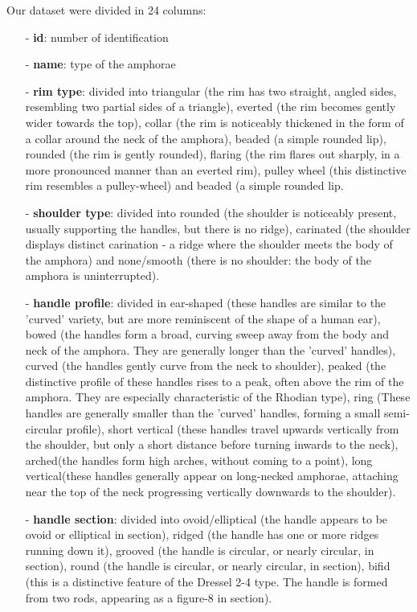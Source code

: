 \documentclass[10pt,a4paper]{article}
\begin{document}
Our dataset were divided in 24 columns:

\begin{itemize}
\item[-] \textbf{id}: number of identification

\item[-] \textbf{name}: type of the amphorae 

\item[-] \textbf{rim type}: divided into triangular (the rim has two straight, angled sides, resembling two partial sides of a triangle), everted (the rim becomes gently wider towards the top), collar (the rim is noticeably thickened in the form of a collar around the neck of the amphora), beaded (a simple rounded lip), rounded (the rim is gently rounded), flaring (the rim flares out sharply, in a more pronounced manner than an everted rim), pulley wheel (this distinctive rim resembles a pulley-wheel) and beaded (a simple rounded lip. 

\item[-] \textbf{shoulder type}: divided into rounded (the shoulder is noticeably present, usually supporting the handles, but there is no ridge), carinated (the shoulder displays distinct carination - a ridge where the shoulder meets the body of the amphora) and none/smooth (there is no shoulder: the body of the amphora is uninterrupted).

\item[-] \textbf{handle profile}: divided in ear-shaped (these handles are similar to the 'curved' variety, but are more reminiscent of the shape of a human ear), bowed (the handles form a broad, curving sweep away from the body and neck of the amphora. They are generally longer than the 'curved' handles), curved (the handles gently curve from the neck to shoulder), peaked (the distinctive profile of these handles rises to a peak, often above the rim of the amphora. They are especially characteristic of the Rhodian type), ring (These handles are generally smaller than the 'curved' handles, forming a small semi-circular profile), short vertical (these handles travel upwards vertically from the shoulder, but only a short distance before turning inwards to the neck), arched(the handles form high arches, without coming to a point), long vertical(these handles generally appear on long-necked amphorae, attaching near the top of the neck progressing vertically downwards to the shoulder).

\item[-] \textbf{handle section}: divided into ovoid/elliptical (the handle appears to be ovoid or elliptical in section), ridged (the handle has one or more ridges running down it), grooved (the handle is circular, or nearly circular, in section), round (the handle is circular, or nearly circular, in section), bifid (this is a distinctive feature of the Dressel 2-4 type. The handle is formed from two rods, appearing as a figure-8 in section).


\end{itemize}
\end{document}
